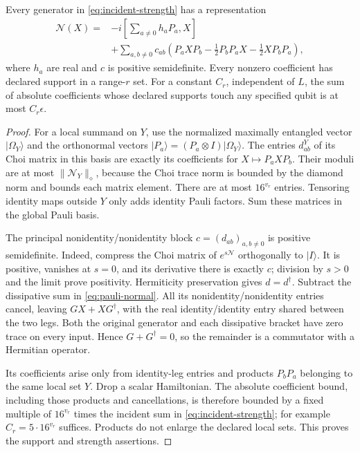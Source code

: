\begin{lemma}\label{lem:choi}
Every generator in \eqref{eq:incident-strength} has a representation
\begin{equation}\label{eq:pauli-normal}
 \begin{split}
 \mathcal N(X)={}&-i\left[\sum_{a\ne0}h_aP_a,X\right]\\
 &+\sum_{a,b\ne0}c_{ab}
 \left(P_aXP_b-\tfrac12P_bP_aX-\tfrac12XP_bP_a\right),
 \end{split}
\end{equation}
where \(h_a\) are real and \(c\) is positive semidefinite.
Every nonzero coefficient has declared support in a range-\(r\)
set. For a constant \(C_r\), independent of \(L\), the sum of
absolute coefficients whose declared supports touch any specified
qubit is at most \(C_r\epsilon\).
\end{lemma}
\begin{proof}
For a local summand on \(Y\), use the normalized maximally
entangled vector \(|\Omega_Y\rangle\) and the orthonormal vectors
\(|P_a\rangle=(P_a\otimes I)|\Omega_Y\rangle\).
The entries \(d^Y_{ab}\) of its Choi matrix in this basis are exactly
its coefficients for \(X\mapsto P_aXP_b\).
Their moduli are at most \(\|\mathcal N_Y\|_\diamond\), because
the Choi trace norm is bounded by the diamond norm and bounds
each matrix element. There are at most \(16^{v_r}\) entries.
Tensoring identity maps outside \(Y\) only adds identity Pauli
factors. Sum these matrices in the global Pauli basis.

The principal nonidentity/nonidentity block \(c=(d_{ab})_{a,b\ne0}\)
is positive semidefinite. Indeed, compress the Choi matrix of
\(e^{s\mathcal N}\) orthogonally to \(|I\rangle\). It is positive,
vanishes at \(s=0\), and its derivative there is exactly \(c\);
division by \(s>0\) and the limit prove positivity.
Hermiticity preservation gives \(d=d^\dagger\).
Subtract the dissipative sum in \eqref{eq:pauli-normal}.
All its nonidentity/nonidentity entries cancel, leaving
\(GX+XG^\dagger\), with the real identity/identity entry
shared between the two legs. Both the original generator and
each dissipative bracket have zero trace on every input.
Hence \(G+G^\dagger=0\), so the remainder is a commutator
with a Hermitian operator.

Its coefficients arise only from identity-leg entries and products
\(P_bP_a\) belonging to the same local set \(Y\).
Drop a scalar Hamiltonian. The absolute coefficient bound,
including those products and cancellations, is therefore bounded
by a fixed multiple of \(16^{v_r}\) times the incident sum in
\eqref{eq:incident-strength}; for example \(C_r=5\cdot16^{v_r}\)
suffices. Products do not enlarge the declared local sets.
This proves the support and strength assertions.
\end{proof}


